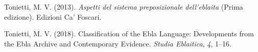 \documentclass[
]{book}
\newlength{\cslhangindent}
\newlength{\cslentryspacingunit} %
\newenvironment{CSLReferences}[2] %
 {%
  \setlength{\parindent}{0pt}
  \ifodd #1
  \let\oldpar\par
  \def\par{\hangindent=\cslhangindent\oldpar}
  \fi
  \setlength{\parskip}{#2\cslentryspacingunit}
 }%
 {}
\begin{document}
\begin{CSLReferences}{1}{0}
\leavevmode{}%
Tonietti, M. V. (2013). \emph{Aspetti del sistema preposizionale dell'eblaita} (Prima edizione). Edizioni Ca' Foscari.

\leavevmode{}%
Tonietti, M. V. (2018). Classification of the {Ebla Language}: {Developments} from the {Ebla Archive} and {Contemporary Evidence}. \emph{Studia Eblaitica}, \emph{4}, 1--16.

\end{CSLReferences}
\end{document}
